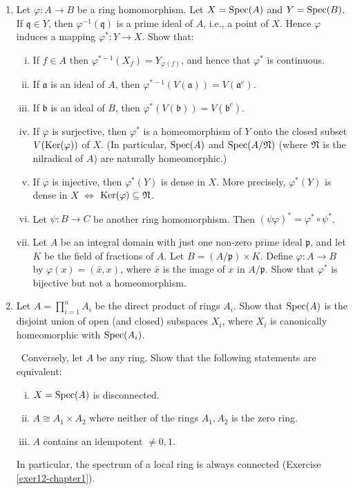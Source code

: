 \begin{enumerate}
    \item \label{exer21-chapter1}Let $\varphi \colon A \to B$ be a ring homomorphism. Let $X = \operatorname{Spec}(A)$ and $Y = \operatorname{Spec}(B)$. If $\mathfrak{q} \in Y$, then $\varphi^{-1}(\mathfrak{q})$ is a prime ideal of $A$, i.e., a point of $X$. Hence $\varphi$ induces a mapping $\varphi^* \colon Y \to X$. Show that:
    \begin{enumerate}[i)]
        \item If $f \in A$ then $\varphi^{*-1}(X_f) = Y_{\varphi(f)}$, and hence that $\varphi^*$ is continuous.
        \item If $\mathfrak{a}$ is an ideal of $A$, then $\varphi^{*-1}(V(\mathfrak{a})) = V(\mathfrak{a}^e)$.
        \item If $\mathfrak{b}$ is an ideal of $B$, then $\varphi^*(V(\mathfrak{b})) = V(\mathfrak{b}^c)$.
        \item If $\varphi$ is surjective, then $\varphi^*$ is a homeomorphism of $Y$ onto the closed subset $V(\operatorname{Ker}(\varphi))$ of $X$. (In particular, $\operatorname{Spec}(A)$ and $\operatorname{Spec}(A/\mathfrak{N})$ (where $\mathfrak{N}$ is the nilradical of $A$) are naturally homeomorphic.)
        \item If $\varphi$ is injective, then $\varphi^*(Y)$ is dense in $X$. More precisely, $\varphi^*(Y)$ is dense in $X$ $\iff$ $\operatorname{Ker}(\varphi) \subseteq \mathfrak{N}$.
        \item Let $\psi \colon B \to C$ be another ring homomorphism. Then $(\psi\varphi)^* = \varphi^* \circ \psi^*$.
        \item Let $A$ be an integral domain with just one non-zero prime ideal $\mathfrak{p}$, and let $K$ be the field of fractions of $A$. Let $B = (A/\mathfrak{p}) \times K$. Define $\varphi \colon A \to B$ by $\varphi(x) = (\bar{x}, x)$, where $\bar{x}$ is the image of $x$ in $A/\mathfrak{p}$. Show that $\varphi^*$ is bijective but not a homeomorphism.
    \end{enumerate}

    \item \label{exer22-chapter1}Let $A = \prod_{i=1}^n A_i$ be the direct product of rings $A_i$. Show that $\operatorname{Spec}(A)$ is the disjoint union of open (and closed) subspaces $X_i$, where $X_i$ is canonically homeomorphic with $\operatorname{Spec}(A_i)$.
    
    \quad\, Conversely, let $A$ be any ring. Show that the following statements are equivalent:
    \begin{enumerate}[i)]
        \item $X = \operatorname{Spec}(A)$ is disconnected.
        \item $A \cong A_1 \times A_2$ where neither of the rings $A_1, A_2$ is the zero ring.
        \item $A$ contains an idempotent $\neq 0, 1$.
    \end{enumerate}
    In particular, the spectrum of a local ring is always connected (Exercise \ref{exer12-chapter1}).


\end{enumerate}
